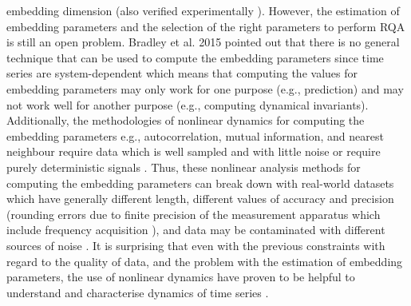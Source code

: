 \documentclass[fleqn,10pt]{wlscirep}
\begin{document}
embedding dimension (also verified experimentally \cite{iwanski1998}).
However, the estimation of embedding parameters and the selection of the 
right parameters to perform RQA is still an open problem.
Bradley et al. 2015 \cite{bradley2015} pointed out that
there is no general technique that can be used to compute the embedding
parameters since time series are system-dependent which means that
computing the values for embedding parameters may only work for
one purpose (e.g., prediction) and may not work well for another purpose
(e.g., computing dynamical invariants).
Additionally, the methodologies of nonlinear dynamics for 
computing the embedding parameters e.g., autocorrelation, mutual information, 
and nearest neighbour require data which is well 
sampled and with little noise \cite{garland2016}
or require purely deterministic signals \cite{kantz2003}.
Thus, these nonlinear analysis methods for computing the embedding 
parameters can break down
with real-world datasets which have generally different length, 
different values of accuracy and precision (rounding errors due to finite 
precision of the measurement apparatus which include frequency 
acquisition \cite{frank2010}),
and data may be contaminated with different sources of noise
\cite{garland2016}.
It is surprising that even with the previous constraints with regard to 
the quality of data, and the problem with the estimation of embedding parameters,
the use of nonlinear dynamics have proven to be helpful to understand and 
characterise dynamics of time series 
\cite{Quintana-Duque2012, Quintana-Duque2016, sama2013, frank2010,
gomezgarcia2014, gomezgarcia2014, marwan2011, stergiou2011, bradley2015}.

\end{document}
